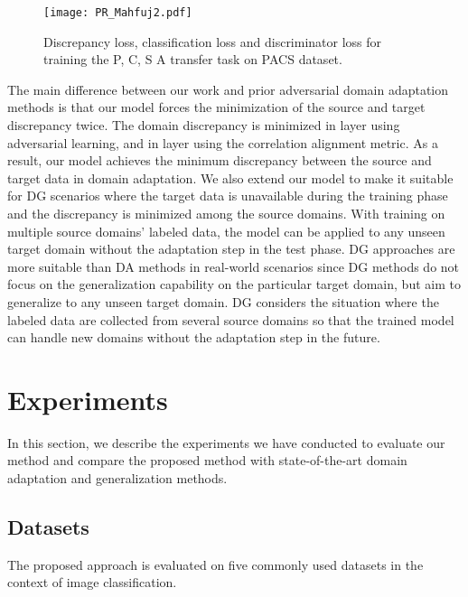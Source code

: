 \documentclass[review]{elsarticle}
\begin{document}
\begin{figure}[htbp!]
\begin{center}
\texttt{[image: PR\_Mahfuj2.pdf]}
\end{center}
   \caption{ Discrepancy loss, classification loss and discriminator loss for training the P, C, S  A transfer task on PACS dataset.}
\label{fig:Loss}
\end{figure}


The main difference between our work and prior adversarial domain adaptation methods \cite{pmlr-v37-ganin15, 8099799} is that our model forces the minimization of the source and target discrepancy twice. The domain discrepancy is minimized in  layer using adversarial learning, and  in  layer using the correlation alignment metric. As a result, our model achieves the minimum discrepancy between the source and target data in domain adaptation. We also extend our model to make it suitable for DG scenarios where the target data is unavailable during the training phase and the discrepancy is minimized among the source domains. With training on multiple source domains' labeled data, the model can be applied to any unseen target domain without the adaptation step in the test phase. DG approaches are more suitable than DA methods in real-world scenarios since DG methods do not focus on the generalization capability on the particular target domain, but aim to generalize to any unseen target domain. DG considers the situation where the labeled data are collected from several source domains so that the trained model can handle new domains without the adaptation step in the future.










\section{Experiments}

In this section, we describe the experiments we have conducted to evaluate our method and compare the proposed method with state-of-the-art domain adaptation and generalization methods.

\subsection{Datasets}
The proposed approach is evaluated on five commonly used datasets in the context of image classification.
\end{document}
